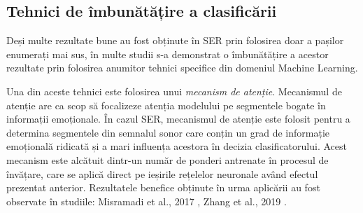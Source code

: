 \documentclass[a4paper,12pt]{book}
\begin{document}
					\subsection{Tehnici de îmbunătățire a clasificării} \label{tehnici}
						Deși multe rezultate bune au fost obținute în SER prin folosirea doar a pașilor enumerați mai sus, în multe studii s-a demonstrat o îmbunătățire a acestor rezultate prin folosirea anumitor tehnici specifice din domeniul Machine Learning. \par
						Una din aceste tehnici este folosirea unui \textit{mecanism de atenție}. Mecanismul de atenție are ca scop să focalizeze atenția modelului pe segmentele bogate în informații emoționale. În cazul SER, mecanismul de atenție este folosit pentru a determina segmentele din semnalul sonor care conțin un grad de informație emoțională ridicată și a mari influența acestora în decizia clasificatorului. Acest mecanism este alcătuit dintr-un număr de ponderi antrenate în procesul de învățare, care se aplică direct pe ieșirile rețelelor neuronale având efectul prezentat anterior.  Rezultatele benefice obținute în urma aplicării au fost observate în studiile: Misramadi et al., 2017 \cite{misramadi}, Zhang et al., 2019 \cite{zhang} . \par
						
\end{document}
